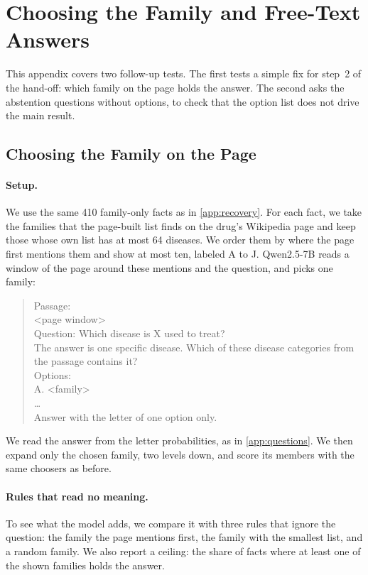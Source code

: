 \section{Choosing the Family and Free-Text Answers}
\label{app:followup}

This appendix covers two follow-up tests. The first tests a simple fix for step~2 of the hand-off: which family on the page holds the answer. The second asks the abstention questions without options, to check that the option list does not drive the main result.

\subsection{Choosing the Family on the Page}

\paragraph{Setup.}
We use the same 410 family-only facts as in \cref{app:recovery}. For each fact, we take the families that the page-built list finds on the drug's Wikipedia page and keep those whose own list has at most 64 diseases. We order them by where the page first mentions them and show at most ten, labeled A to J. Qwen2.5-7B reads a window of the page around these mentions and the question, and picks one family:
\begin{quote}
\footnotesize\ttfamily
Passage:\\
<page window>\\[2pt]
Question: Which disease is X used to treat?\\
The answer is one specific disease. Which of these disease categories from the passage contains it?\\
Options:\\
A. <family>\\
\ldots\\
Answer with the letter of one option only.
\end{quote}
We read the answer from the letter probabilities, as in \cref{app:questions}. We then expand only the chosen family, two levels down, and score its members with the same choosers as before.

\paragraph{Rules that read no meaning.}
To see what the model adds, we compare it with three rules that ignore the question: the family the page mentions first, the family with the smallest list, and a random family. We also report a ceiling: the share of facts where at least one of the shown families holds the answer.

